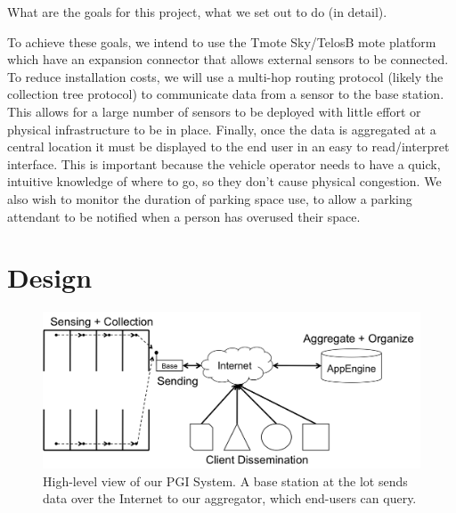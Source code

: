 \documentclass{acm_proc}
\begin{document}
What are the goals for this project, what we set out to do (in detail).


To achieve these goals, we intend to use the Tmote Sky/TelosB mote platform
which have an expansion connector that allows external sensors to be
connected.
To reduce installation costs, we will use a multi-hop routing protocol
(likely
the collection tree protocol) to communicate data from a sensor to the base
station.
This allows for a large number of sensors to be deployed with little effort
or
physical infrastructure to be in place.
Finally, once the data is aggregated at a central location it must be
displayed
to the end user in an easy to read/interpret interface.
This is important because the vehicle operator needs to have a quick,
intuitive
knowledge of where to go, so they don't cause physical congestion.
We also wish to monitor the duration of parking space use, to allow a
parking
attendant to be notified when a person has overused their space.

\section{Design}\label{sec:design}

\begin{figure}
    \begin{center}
		\includegraphics[width=\columnwidth]{figures/high-level}
	\end{center}
	\caption{High-level view of our PGI System. A base station at the lot
	sends data over the Internet to our aggregator, which end-users can
	query.}
	\label{fig:high-level}
\end{figure}
\end{document}
